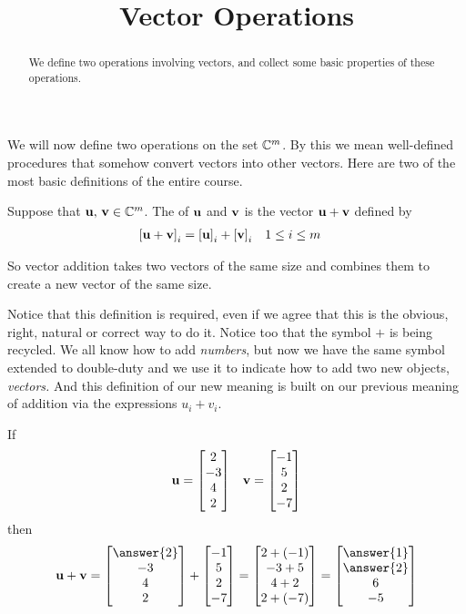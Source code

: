 \documentclass{ximera}
\title{Vector Operations}
\begin{document}
\begin{abstract}
  We define two operations involving vectors, and collect some basic
  properties of these operations.
\end{abstract}
\maketitle

We will now define two operations on the set $\mathbb{C}^{m}$.  By this
we mean well-defined procedures that somehow convert vectors into
other vectors.  Here are two of the most basic definitions of the
entire course.

\begin{definition}
  Suppose that $\mathbf{u},\,\mathbf{v}\in\mathbb{C}^{m}$. The  of
  $\mathbf{u}$ and $\mathbf{v}$ is the vector $\mathbf{u}+\mathbf{v}$ defined
  by
  \begin{align*}
    \left\lbrack\mathbf{u}+\mathbf{v}\right\rbrack_{i}
    &=\left\lbrack\mathbf{u}\right\rbrack_{i}+\left\lbrack\mathbf{v}\right\rbrack_{i}
    &&1\leq i\leq m
  \end{align*}
\end{definition}

So vector addition takes two vectors of the same size and combines
them to create a new vector of the same size.

Notice that this definition is required, even if we agree that this is
the obvious, right, natural or correct way to do it.  Notice too that
the symbol $+$ is being recycled.  We all know how to add
\textit{numbers}, but now we have the same symbol extended to
double-duty and we use it to indicate how to add two new objects,
\textit{vectors.}  And this definition of our new meaning is built on
our previous meaning of addition via the expressions $u_i+v_i$.

\begin{example}
  If
  \begin{align*}
    \mathbf{u}=\begin{bmatrix}2\\-3\\4\\2\end{bmatrix}&&\mathbf{v}=\begin{bmatrix}-1\\5\\2\\-7\end{bmatrix}
  \end{align*}
  then
  \[\vect{u}+\vect{v}=
    \colvector{\answer{2}\\-3\\4\\2}+\colvector{-1\\5\\2\\-7}=
    \colvector{2+(-1)\\-3+5\\4+2\\2+(-7)}=
    \colvector{\answer{1}\\\answer{2}\\6\\-5}\]
\end{example}
\end{document}
